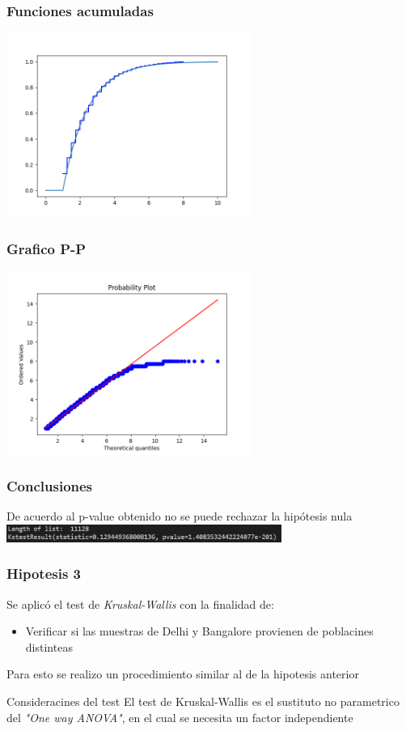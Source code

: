 \documentclass{beamer}
\begin{document}
\begin{frame}
  \frametitle{Funciones acumuladas}
  \includegraphics[width=8cm]{hip2/acumuladas.png}

\end{frame}

\begin{frame}
  \frametitle{Grafico P-P}
  \includegraphics[width=8cm]{hip2/grafico_pp.png}
\end{frame}

\begin{frame}
  \frametitle{Conclusiones}
  De acuerdo al p-value obtenido no se puede rechazar la hipótesis nula
  \includegraphics[width=9cm]{hip2/p-val.jpg}
\end{frame}

\begin{frame}
  \frametitle{Hipotesis 3}

  Se aplicó el test de \textit{Kruskal-Wallis} con la finalidad de:

  \begin{itemize}
      \item Verificar si las muestras de Delhi y Bangalore provienen de poblacines
        distinteas
  \end{itemize}

  Para esto se realizo un procedimiento similar al de la hipotesis anterior

  \begin{alertblock}{Consideracines del test}
    El test de Kruskal-Wallis es el sustituto no parametrico del
    \textit{"One way ANOVA"}, en el cual se necesita un factor independiente
  \end{alertblock}
\end{frame}
\end{document}
